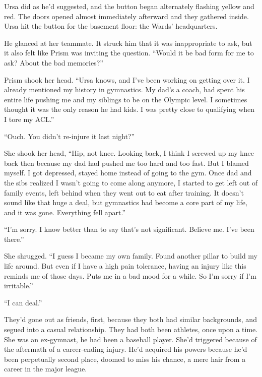 Ursa did as he'd suggested, and the button began alternately flashing yellow and red.  The doors opened almost immediately afterward and they gathered inside.  Ursa hit the button for the basement floor: the Wards' headquarters.



He glanced at her teammate.  It struck him that it was inappropriate to ask, but it also felt like Prism was inviting the question.  ``Would it be bad form for me to ask?  About the bad memories?''



Prism shook her head.  ``Ursa knows, and I've been working on getting over it.  I already mentioned my history in gymnastics.  My dad's a coach, had spent his entire life pushing me and my siblings to be on the Olympic level.  I sometimes thought it was the only reason he had kids.  I was pretty close to qualifying when I tore my ACL.''



``Ouch.  You didn't re-injure it last night?''



She shook her head, ``Hip, not knee.  Looking back, I think I screwed up my knee back then because my dad had pushed me too hard and too fast.  But I blamed myself.  I got depressed, stayed home instead of going to the gym.  Once dad and the sibs realized I wasn't going to come along anymore, I started to get left out of family events, left behind when they went out to eat after training.  It doesn't sound like that huge a deal, but gymnastics had become a core part of my life, and it was gone.  Everything fell apart.''



``I'm sorry.  I know better than to say that's not significant.  Believe me.  I've been there.''



She shrugged.  ``I guess I became my own family.  Found another pillar to build my life around.  But even if I have a high pain tolerance, having an injury like this reminds me of those days.  Puts me in a bad mood for a while.  So I'm sorry if I'm irritable.''



``I can deal.''



They'd gone out as friends, first, because they both had similar backgrounds, and segued into a casual relationship.  They had both been athletes, once upon a time.  She was an ex-gymnast, he had been a baseball player.  She'd triggered because of the aftermath of a career-ending injury.  He'd acquired his powers because he'd been perpetually second place, doomed to miss his chance, a mere hair from a career in the major league.




